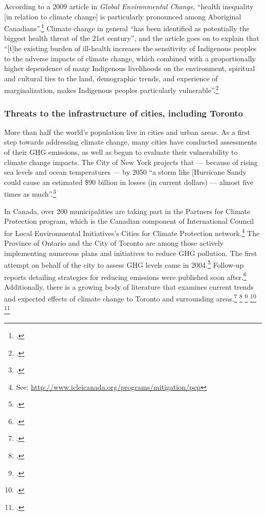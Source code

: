 \documentclass[10pt]{article}
\begin{document}
According to a 2009 article in \emph{Global Environmental Change}, ``health inequality [in relation to climate change] is
particularly pronounced among Aboriginal Canadians''.\footcite[][p. 1]{VulAborig2009}
Climate change in general ``has been identified as potentially the biggest health threat of the 21st century'', and the article goes on to explain that ``[t]he existing burden of ill-health increases the sensitivity of Indigenous peoples to the adverse impacts of climate change, which combined with a proportionally higher dependence of many Indigenous livelihoods on the environment, spiritual and cultural ties to the land, demographic trends, and experience of marginalization, makes Indigenous peoples particularly vulnerable''.\footcite[][p. 1]{VulAborig2009}



	\subsubsection{Threats to the infrastructure of cities, including Toronto}



More than half the world's population live in cities and urban areas. 
As a first step towards addressing climate change, many cities have conducted assessments of their GHG emissions, as well as begun to evaluate their vulnerability to climate change impacts.
The City of New York projects that --- because of rising sea levels and ocean temperatures --- by 2050 ``a storm like [Hurricane Sandy could cause an estimated \$90 billion in losses (in current dollars) --- almost five times as much''.\footcite[][Foreward, p. 2]{ResilientNewYork}



In Canada, over 200 municipalities are taking part in the Partners for Climate Protection  program, which is the Canadian component of International Council for Local Environmental Initiatives's Cities for Climate Protection network.\footnote{See: \url{http://www.icleicanada.org/programs/mitigation/pcp}}
The Province of Ontario and the City of Toronto are among those actively implementing numerous plans and initiatives to reduce GHG pollution. 
The first attempt on behalf of the city to assess GHG levels came in 2004.\footcite[][p. IV]{GHGPollutionToronto}
Follow-up reports detailing strategies for reducing emissions were published soon after.\footcite[][]{CCAHealthEquity}
Additionally, there is a growing body of literature that examines current trends and expected effects of climate change to Toronto and surrounding areas.\footcite[][]{TorontoEnvOff2007} \footcite[][]{TorontoAheadStorm} \footcite[][]{ScanCCToronto} \footcite[][]{AdaptPrioritiesCanada} \footcite[][]{MacLeodAdaptation}
\end{document}
